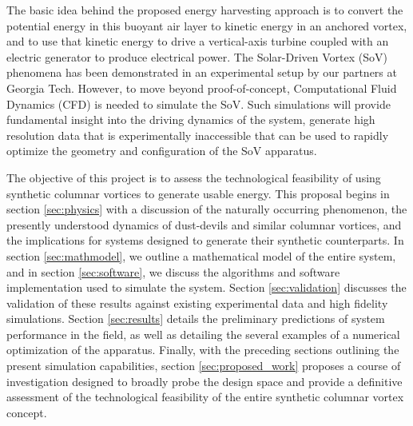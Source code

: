 The basic idea behind the proposed energy harvesting approach is to convert the 
potential energy in this buoyant air layer to kinetic energy in an
anchored vortex, and to use that kinetic energy to drive a
vertical-axis turbine coupled with an electric generator  to
produce electrical power. 
The Solar-Driven Vortex (SoV) phenomena has been demonstrated in
an experimental setup by our partners at Georgia Tech. However, to 
move beyond proof-of-concept, Computational Fluid 
Dynamics (CFD) is needed to simulate the SoV. Such simulations will
provide fundamental insight into the 
driving dynamics of the system, generate high resolution data that is 
experimentally inaccessible that can be used to rapidly optimize the
geometry and configuration of the SoV apparatus. 


%
%

The objective of this project is to assess the technological feasibility of 
using synthetic columnar vortices to generate usable energy. 
This proposal begins in section \ref{sec:physics} with a discussion of the 
naturally occurring phenomenon, the presently understood dynamics of
dust-devils and similar columnar vortices, and the implications for systems
designed to generate their synthetic counterparts. 
In section \ref{sec:mathmodel}, we outline a mathematical model of
the entire system, and in section \ref{sec:software}, we discuss the
algorithms and software implementation used to simulate the
system. Section \ref{sec:validation} discusses the 
validation of these results against existing experimental data and high
fidelity simulations. Section \ref{sec:results} details the preliminary
predictions of system performance in the field, as well as detailing the 
several examples of a numerical optimization of the apparatus. Finally, with the 
preceding sections outlining the present simulation capabilities, 
section \ref{sec:proposed_work} proposes a course of investigation
designed to broadly probe the design space and provide a
definitive assessment of the technological feasibility of the entire 
synthetic columnar vortex concept. 


